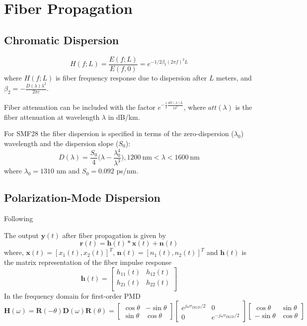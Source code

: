 \documentclass[a4paper]{article}
\begin{document}
\section{Fiber Propagation}
\subsection{Chromatic Dispersion}
\begin{equation}
H(f; L) = \frac{E(f; L)}{E(f, 0)} = e^{-1/2\beta_2(2\pi f)^2L}
\end{equation}
where $H(f; L)$ is fiber frequency response due to dispersion after $L$ meters, and $\beta_2 = -\frac{D(\lambda)\lambda^2}{2\pi c}$. 

Fiber attenuation can be included with the factor $e^{-\frac{1}{2}\frac{att(\lambda)L}{10^4}}$, where $att(\lambda)$ is the fiber attenuation at wavelength $\lambda$ in dB/km.

For SMF28 the fiber dispersion is specified in terms of the zero-dispersion ($\lambda_0$) wavelength and the dispersion slope ($S_0$):
\begin{equation}
D(\lambda) = \frac{S_0}{4}\bigg(\lambda - \frac{\lambda_0^4}{\lambda^3}\bigg), 1200~\text{nm} < \lambda < 1600~\text{nm}
\end{equation}
where $\lambda_0 = 1310$ nm and $S_0 = 0.092$ ps/nm.

\subsection{Polarization-Mode Dispersion}
Following \cite{Ip2008}

The output $\bm{y}(t)$ after fiber propagation is given by
\begin{equation}
\bm{r}(t) = \bm{h}(t)\ast \bm{x}(t) + \bm{n}(t)
\end{equation}
where, $\bm{x}(t) = [x_1(t), x_2(t)]^T$, $\bm{n}(t) = [n_1(t), n_2(t)]^T$ and $\bm{h}(t)$ is the matrix representation of the fiber impulse response
\begin{equation}
\bm{h}(t) = \begin{bmatrix}
h_{11}(t) & h_{12}(t) \\
h_{21}(t) & h_{22}(t) \\
\end{bmatrix}
\end{equation}
In the frequency domain for first-order PMD
\begin{equation}
\bm{H}(\omega) = \bm{R}(-\theta)\bm{D}(\omega)\bm{R}(\theta)=\begin{bmatrix}
\cos\theta & -\sin\theta \\
\sin\theta & \cos\theta
\end{bmatrix}\begin{bmatrix}
e^{j\omega\tau_{DGD}/2} & 0 \\
0 & e^{-j\omega\tau_{DGD}/2}
\end{bmatrix}\begin{bmatrix}
\cos\theta & \sin\theta \\
-\sin\theta & \cos\theta
\end{bmatrix}
\end{equation}
\end{document}
